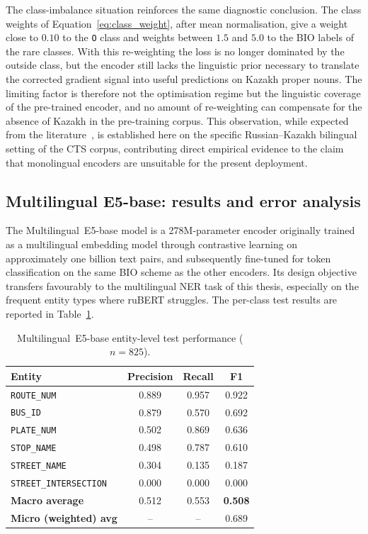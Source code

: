 The class-imbalance situation reinforces the same diagnostic conclusion. The class weights of Equation~\eqref{eq:class_weight}, after mean normalisation, give a weight close to $0.10$ to the \texttt{O} class and weights between $1.5$ and $5.0$ to the BIO labels of the rare classes. With this re-weighting the loss is no longer dominated by the outside class, but the encoder still lacks the linguistic prior necessary to translate the corrected gradient signal into useful predictions on Kazakh proper nouns. The limiting factor is therefore not the optimisation regime but the linguistic coverage of the pre-trained encoder, and no amount of re-weighting can compensate for the absence of Kazakh in the pre-training corpus. This observation, while expected from the literature~\cite{conneau2020xlmr,iqbal2024multilingual}, is established here on the specific Russian--Kazakh bilingual setting of the CTS corpus, contributing direct empirical evidence to the claim that monolingual encoders are unsuitable for the present deployment.

\subsection{Multilingual E5-base: results and error analysis}
\label{sec:me5_results}

The Multilingual~E5-base model is a 278M-parameter encoder originally trained as a multilingual embedding model through contrastive learning on approximately one billion text pairs, and subsequently fine-tuned for token classification on the same BIO scheme as the other encoders. Its design objective transfers favourably to the multilingual NER task of this thesis, especially on the frequent entity types where ruBERT struggles. The per-class test results are reported in Table~\ref{tab:me5}.

\begin{table}[H]
\centering
\caption{Multilingual~E5-base entity-level test performance ($n=825$).}
\label{tab:me5}
\renewcommand{\arraystretch}{1.3}
\begin{tabular}{lccc}
\toprule
\textbf{Entity} & \textbf{Precision} & \textbf{Recall} & \textbf{F1} \\
\midrule
\texttt{ROUTE\_NUM}           & 0.889 & 0.957 & 0.922 \\
\texttt{BUS\_ID}              & 0.879 & 0.570 & 0.692 \\
\texttt{PLATE\_NUM}           & 0.502 & 0.869 & 0.636 \\
\texttt{STOP\_NAME}           & 0.498 & 0.787 & 0.610 \\
\texttt{STREET\_NAME}         & 0.304 & 0.135 & 0.187 \\
\texttt{STREET\_INTERSECTION} & 0.000 & 0.000 & 0.000 \\
\midrule
\textbf{Macro average}        & 0.512 & 0.553 & \textbf{0.508} \\
\textbf{Micro (weighted) avg} & --    & --    & 0.689 \\
\bottomrule
\end{tabular}
\end{table}

